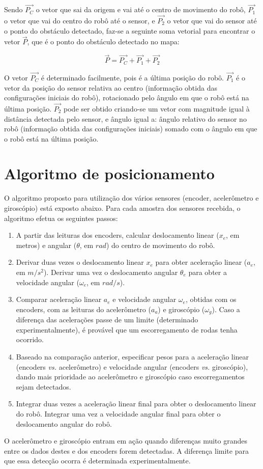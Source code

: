 Sendo $\overrightarrow{P_C}$ o vetor que sai da origem e vai até o centro de movimento do robô, $\overrightarrow{P_1}$ o vetor que vai do centro do robô até o sensor, e $\overrightarrow{P_2}$ o vetor que vai do sensor até o ponto do obstáculo detectado, faz-se a seguinte soma vetorial para encontrar o vetor $\overrightarrow{P}$, que é o ponto do obstáculo detectado no mapa:

\begin{equation}
  \overrightarrow{P} = \overrightarrow{P_C} + \overrightarrow{P_1} + \overrightarrow{P_2}
  \label{eq:IR_vector}
\end{equation}


O vetor $\overrightarrow{P_C}$ é determinado facilmente, pois é a última posição do robô. $\overrightarrow{P_1}$ é o vetor da posição do sensor relativa ao centro (informação obtida das configurações iniciais do robô), rotacionado pelo ângulo em que o robô está na última posição. $\overrightarrow{P_2}$ pode ser obtido criando-se um vetor com magnitude igual à distância detectada pelo sensor, e ângulo igual a: ângulo relativo do sensor no robô (informação obtida das configurações iniciais) somado com o ângulo em que o robô está na última posição.

\section{Algoritmo de posicionamento}

O algoritmo proposto para utilização dos vários sensores (encoder, acelerômetro e giroscópio) está exposto abaixo. Para cada amostra dos sensores recebida, o algoritmo efetua os seguintes passos:

\begin{enumerate}
      \item A partir das leituras dos encoders, calcular deslocamento linear ($x_e$, em metros) e angular ($\theta$, em $rad$) do centro de movimento do robô.
      \item Derivar duas vezes o deslocamento linear $x_e$ para obter aceleração linear ($a_e$, em $m/s^2$). Derivar uma vez o deslocamento angular $\theta_e$ para obter a velocidade angular ($\omega_e$, em $rad/s$).
      \item Comparar aceleração linear $a_e$ e velocidade angular $\omega_e$, obtidas com os encoders, com as leituras do acelerômetro ($a_a$) e giroscópio ($\omega_g$). Caso a diferença das acelerações passe de um limite (determinado experimentalmente), é provável que um escorregamento de rodas tenha ocorrido.
      \item Baseado na comparação anterior, especificar pesos para a aceleração linear (encoders \textit{vs.} acelerômetro) e velocidade angular (encoders \textit{vs.} giroscópio), dando mais prioridade ao acelerômetro e giroscópio caso escorregamentos sejam detectados.
      \item Integrar duas vezes a aceleração linear final para obter o deslocamento linear do robô. Integrar uma vez a velocidade angular final para obter o deslocamento angular do robô.
\end{enumerate}


O acelerômetro e giroscópio entram em ação quando diferenças muito grandes entre os dados destes e dos encoders forem detectadas. A diferença limite para que essa detecção ocorra é determinada experimentalmente.

